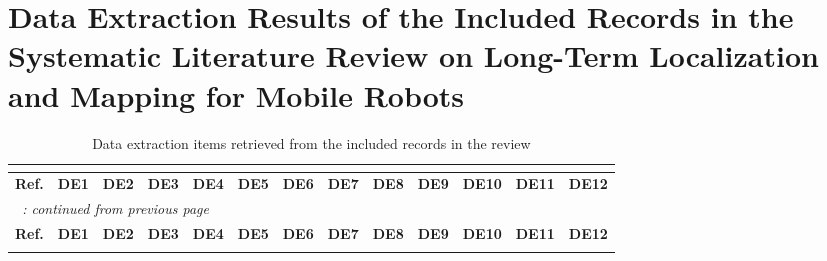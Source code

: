 \clearpage

\section{Data Extraction Results of the Included Records in the Systematic Literature Review on Long-Term Localization and Mapping for Mobile Robots}
\label{a2:data-extraction}

\begin{tiny}

\begin{longtable}{p{}p{}p{}p{}p{}p{}p{}p{}p{}p{}p{}p{}p{}}
  \caption{Data extraction items retrieved from the included records in the review}
  \vspace{0.5em}
  \label{tab:a2:data-extraction}\\

\hline
\textbf{Ref.} & \textbf{DE1} & \textbf{DE2} & \textbf{DE3} & \textbf{DE4} & \textbf{DE5} & \textbf{DE6} & \textbf{DE7} & \textbf{DE8} & \textbf{DE9} & \textbf{DE10} & \textbf{DE11} & \textbf{DE12}\\
\hline
\endfirsthead

\multicolumn{13}{l}{\itshape{\tablename\ \thetable{}: continued from previous page}}
\vspace{0.5em}\\
\hline
\textbf{Ref.} & \textbf{DE1} & \textbf{DE2} & \textbf{DE3} & \textbf{DE4} & \textbf{DE5} & \textbf{DE6} & \textbf{DE7} & \textbf{DE8} & \textbf{DE9} & \textbf{DE10} & \textbf{DE11} & \textbf{DE12}\\
\hline
\endhead

\hline
\endfoot
\hline
\endlastfoot




\end{longtable}
\end{tiny}
